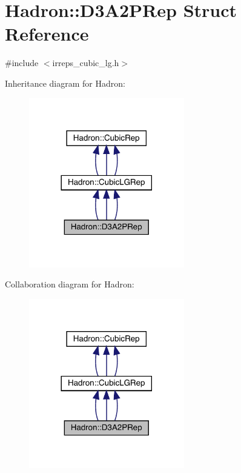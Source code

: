 \hypertarget{structHadron_1_1D3A2PRep}{}\section{Hadron\+:\+:D3\+A2\+P\+Rep Struct Reference}
\label{structHadron_1_1D3A2PRep}


{\ttfamily \#include $<$irreps\+\_\+cubic\+\_\+lg.\+h$>$}



Inheritance diagram for Hadron\+:
\nopagebreak
\begin{figure}[H]
\begin{center}
\leavevmode
\includegraphics[width=192pt]{de/dd9/structHadron_1_1D3A2PRep__inherit__graph}
\end{center}
\end{figure}


Collaboration diagram for Hadron\+:
\nopagebreak
\begin{figure}[H]
\begin{center}
\leavevmode
\includegraphics[width=192pt]{d2/dc8/structHadron_1_1D3A2PRep__coll__graph}
\end{center}
\end{figure}
